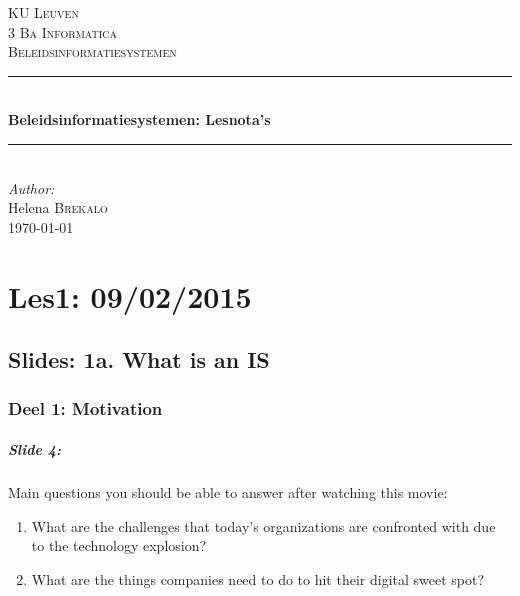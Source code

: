\documentclass[10pt,a4paper]{report}
\author{Helena Brekalo}
\begin{document}
\begin{titlepage}

\newcommand{\HRule}{\rule{\linewidth}{0.5mm}} %

\center %
 
\textsc{\LARGE KU Leuven}\\[1.5cm] %
\textsc{\Large 3 Ba Informatica}\\[0.5cm] %
\textsc{\large Beleidsinformatiesystemen}\\[0.5cm] %


\HRule \\[0.4cm]
{ \huge \bfseries Beleidsinformatiesystemen: Lesnota's}\\[0.4cm]
\HRule \\[1.5cm]
 

\Large \emph{Author:}\\
Helena \textsc{Brekalo}\\[3cm]

{\large \today}\\[3cm] %

\vfill %

\end{titlepage}

\tableofcontents

\chapter{Les1: 09/02/2015}
\section{Slides: 1a. What is an IS}

\subsection{Deel 1: Motivation}

\paragraph{Slide 4:}Main questions you should be able to answer after watching this movie:
\begin{enumerate}
\item What are the challenges that today's organizations are confronted with due to the technology explosion?
\item What are the things companies need to do to hit their digital sweet spot?
\end{enumerate}
\end{document}
